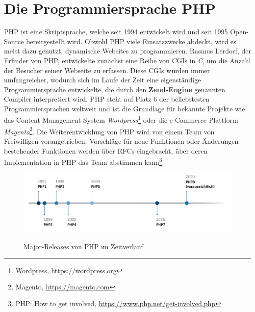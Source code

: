 \section{Die Programmiersprache PHP}
\ac{PHP} ist eine Skriptsprache, welche seit 1994 entwickelt wird und seit 1995 Open-Source bereitgestellt wird.
Obwohl \ac{PHP} viele Einsatzzwecke abdeckt, wird es meist dazu genutzt, dynamische Websites zu programmieren.
Rasmus Lerdorf, der Erfinder von \ac{PHP}, entwickelte zunächst eine Reihe von \acp{CGI} in \textit{C}, um die Anzahl der 
Besucher seiner Webseite zu erfassen. Diese \acp{CGI} wurden immer umfangreicher, wodurch sich im Laufe der Zeit eine 
eigenständige Programmiersprache entwickelte, die durch den \textbf{Zend-Engine} genannten Compiler interpretiert wird.
\ac{PHP} steht auf Platz 6 der beliebstesten Programmiersprachen weltweit\cite{carbonnelle_pypl_2019} und ist die Grundlage
für bekannte Projekte wie das Content Management System \textit{Wordpress}\footnote{Wordpress, \url{https://wordpress.org}}
oder die e-Commerce Plattform \textit{Magento}\footnote{Magento, \url{https://magento.com}}. Die Weiterentwicklung 
von \ac{PHP} wird von einem Team von Freiwilligen vorangetrieben. Vorschläge für neue Funktionen oder Änderungen bestehender 
Funktionen werden über \acp{RFC} eingebracht, über deren Implementation in \ac{PHP} das Team abstimmen kann\footnote{PHP: How to get involved, \url{https://www.php.net/get-involved.php}}. 

\begin{figure}[bth]
    \myfloatalign
    {\includegraphics[width=1\linewidth]{gfx/timeline}} \quad
    \caption[Major-Releases von PHP im Zeitverlauf]{Major-Releases von \ac{PHP} im Zeitverlauf}\label{fig:timeline}
\end{figure}

